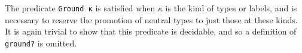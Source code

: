 \documentclass[authoryear, acmsmall, screen, review, nonacm]{acmart}
\begin{document}
The predicate \verb!Ground κ! is satisfied when $\kappa$ is the kind of types or labels, and is necessary to reserve the promotion of neutral types to just those at these kinds. It is again trivial to show that this predicate is decidable, and so a definition of \verb!ground?! is omitted.

\begin{code}%
\>[0]\AgdaSpace{}%
\AgdaSymbol{:}\AgdaSpace{}%
\AgdaSpace{}%
\AgdaSpace{}%
\<%
\\
\>[0]\AgdaSpace{}%
\AgdaSymbol{:}\AgdaSpace{}%
\AgdaSpace{}%
\AgdaSpace{}%
\AgdaSpace{}%
\AgdaSpace{}%
\AgdaSymbol{(}\AgdaSpace{}%
\AgdaSymbol{)}\<%
\\
\>[0]\AgdaSpace{}%
\AgdaSpace{}%
\AgdaSymbol{=}\AgdaSpace{}%
\<%
\\
\>[0]\AgdaSpace{}%
\AgdaSpace{}%
\AgdaSymbol{=}\AgdaSpace{}%
\<%
\\
\>[0]\AgdaSpace{}%
\AgdaSymbol{(}\AgdaSpace{}%
\AgdaSpace{}%
\AgdaSymbol{)}\AgdaSpace{}%
\AgdaSymbol{=}\AgdaSpace{}%
\<%
\\
\>[0]\AgdaSpace{}%
\AgdaOperator{\AgdaInductiveConstructor{R[}}\AgdaSpace{}%
\AgdaSpace{}%
\AgdaOperator{\AgdaInductiveConstructor{]}}\AgdaSpace{}%
\AgdaSymbol{=}\AgdaSpace{}%
\<%
\end{code}
\begin{code}[hide]%
\>[0]\AgdaSpace{}%
\AgdaSpace{}%
\AgdaSymbol{=}\AgdaSpace{}%
\AgdaSpace{}%
\<%
\\
\>[0]\AgdaSpace{}%
\AgdaSpace{}%
\AgdaSymbol{=}\AgdaSpace{}%
\AgdaSpace{}%
\<%
\\
\>[0]\AgdaSpace{}%
\AgdaSymbol{(\AgdaUnderscore{}}\AgdaSpace{}%
\AgdaSpace{}%
\AgdaSymbol{\AgdaUnderscore{})}\AgdaSpace{}%
\AgdaSymbol{=}\AgdaSpace{}%
\AgdaSpace{}%
\AgdaSpace{}%
\AgdaSymbol{())}\<%
\\
\>[0]\AgdaSpace{}%
\AgdaOperator{\AgdaInductiveConstructor{R[}}\AgdaSpace{}%
\AgdaSymbol{\AgdaUnderscore{}}\AgdaSpace{}%
\AgdaOperator{\AgdaInductiveConstructor{]}}\AgdaSpace{}%
\AgdaSymbol{=}\AgdaSpace{}%
\AgdaSpace{}%
\AgdaSpace{}%
\AgdaSymbol{())}\<%
\end{code}
\end{document}
